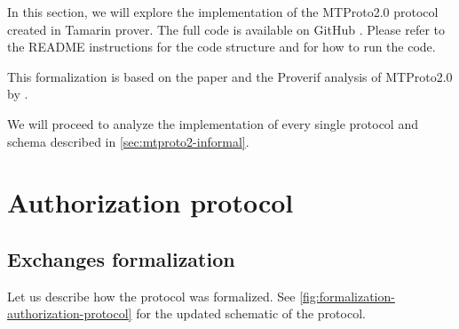 In this section, we will explore the implementation of the MTProto2.0 protocol created in Tamarin prover. The full code is available on GitHub \cite{MTProto2-Tamarin}. Please refer to the README instructions for the code structure and for how to run the code.

This formalization is based on the paper \cite{MTProto2-Proverif} and the Proverif analysis \cite{MTProto2-Proverif-impl} of MTProto2.0 by \MMNV{}.

We will proceed to analyze the implementation of every single protocol and schema described in \cref{sec:mtproto2-informal}.

\section{Authorization protocol}
\label{sec:auth-prot-formalization}
\subsection{Exchanges formalization}
Let us describe how the protocol was formalized. See \cref{fig:formalization-authorization-protocol} for the updated schematic of the protocol.


